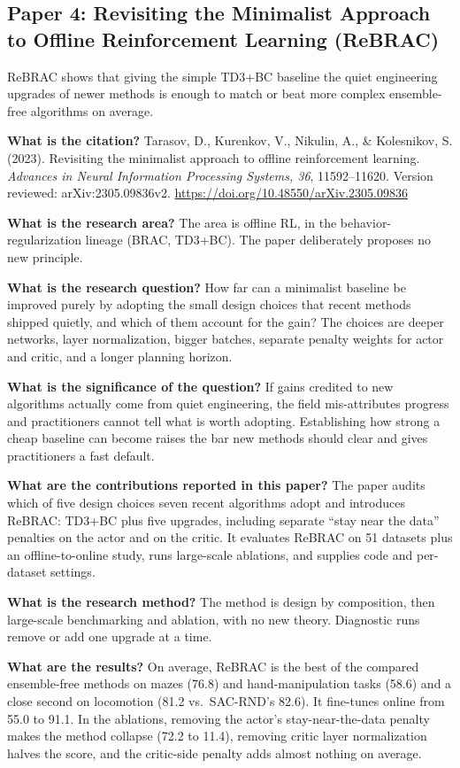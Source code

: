 \documentclass[11pt]{article}
\newcommand{\paper}[1]{\subsection*{#1}}
\newcommand{\q}[2]{\item \textbf{#1} #2}
\begin{document}
\paper{Paper 4: Revisiting the Minimalist Approach to Offline Reinforcement Learning (ReBRAC)}
ReBRAC shows that giving the simple TD3+BC baseline the quiet engineering upgrades of newer methods is enough to match or beat more complex ensemble-free algorithms on average.
\begin{qna}

\q{What is the citation?}
Tarasov, D., Kurenkov, V., Nikulin, A., \& Kolesnikov, S. (2023). Revisiting the minimalist approach to offline reinforcement learning. \emph{Advances in Neural Information Processing Systems, 36}, 11592--11620. Version reviewed: arXiv:2305.09836v2. \url{https://doi.org/10.48550/arXiv.2305.09836}

\q{What is the research area?}
The area is offline RL, in the behavior-regularization lineage (BRAC, TD3+BC). The paper deliberately proposes no new principle.

\q{What is the research question?}
How far can a minimalist baseline be improved purely by adopting the small design choices that recent methods shipped quietly, and which of them account for the gain? The choices are deeper networks, layer normalization, bigger batches, separate penalty weights for actor and critic, and a longer planning horizon.

\q{What is the significance of the question?}
If gains credited to new algorithms actually come from quiet engineering, the field mis-attributes progress and practitioners cannot tell what is worth adopting. Establishing how strong a cheap baseline can become raises the bar new methods should clear and gives practitioners a fast default.

\q{What are the contributions reported in this paper?}
The paper audits which of five design choices seven recent algorithms adopt and introduces ReBRAC: TD3+BC plus five upgrades, including separate ``stay near the data'' penalties on the actor and on the critic. It evaluates ReBRAC on 51 datasets plus an offline-to-online study, runs large-scale ablations, and supplies code and per-dataset settings.

\q{What is the research method?}
The method is design by composition, then large-scale benchmarking and ablation, with no new theory. Diagnostic runs remove or add one upgrade at a time.

\q{What are the results?}
On average, ReBRAC is the best of the compared ensemble-free methods on mazes (76.8) and hand-manipulation tasks (58.6) and a close second on locomotion (81.2 vs.\ SAC-RND's 82.6). It fine-tunes online from 55.0 to 91.1. In the ablations, removing the actor's stay-near-the-data penalty makes the method collapse (72.2 to 11.4), removing critic layer normalization halves the score, and the critic-side penalty adds almost nothing on average.


\end{qna}
\end{document}
